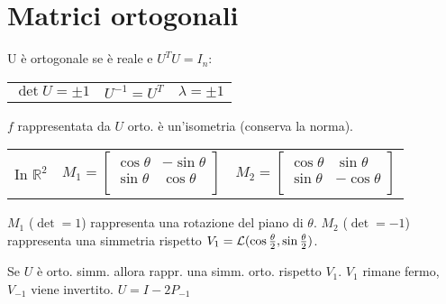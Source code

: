 \section{Matrici ortogonali}

U è ortogonale se è reale e $U^TU=I_n$:

\begin{tabular}{lll}
	$\det U = \pm1$ & $U^{-1}=U^T$ & $\lambda = \pm 1$
\end{tabular}

$f$ rappresentata da $U$ orto. è un'isometria (conserva la norma).

\begin{tabular}{lll}
	In $\mathbb{R}^2$ &
	$
		M_1 = \begin{bmatrix}
			\cos\theta & -\sin\theta \\
			\sin\theta & \cos\theta \\
		\end{bmatrix}
	$ &
	$
		M_2 = \begin{bmatrix}
			\cos\theta & \sin\theta \\
			\sin\theta & -\cos\theta \\
		\end{bmatrix}
	$
\end{tabular}

$M_1$ ($\det = 1$) rappresenta una rotazione del piano di $\theta$. $M_2$ ($\det = -1$) rappresenta una simmetria rispetto $V_1 = \mathcal{L}(\cos\frac{\theta}{2}, \sin\frac{\theta}{2})$.

Se $U$ è orto. simm. allora rappr. una simm. orto. rispetto $V_1$. $V_1$ rimane fermo, $V_{-1}$ viene invertito. $U=I-2P_{-1}$
